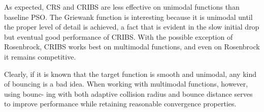 \documentclass[pdftex,11pt]{article}
\begin{document}
As expected, CRS and CRIBS are less effective on unimodal functions than baseline PSO. The Griewank function is interesting because it is unimodal until the proper level of detail is achieved, a fact that is evident in the slow initial drop but eventual good performance of CRIBS. With the possible exception of Rosenbrock, CRIBS works best on multimodal functions, and even on Rosenbrock it remains competitive. 

Clearly, if it is known that the target function is smooth and unimodal, any kind of bouncing is a bad idea. When working with multimodal functions, however, using bounc- ing with both adaptive collision radius and bounce distance serves to improve performance while retaining reasonable convergence properties.
\end{document}
